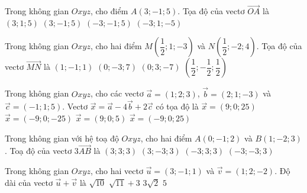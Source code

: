 \begin{ex}%
Trong không gian $Oxyz$, cho điểm $A(3;-1;5)$. Tọa độ của vectơ $\overrightarrow{OA}$ là
\choice
{$(3;1;5)$}
{\True $(3;-1;5)$}
{$(-3;-1;5)$}
{$(-3;1;-5)$}
\end{ex}


\begin{ex}%
Trong không gian $Oxyz$, cho hai điểm $M\left(\dfrac{1}{2};1;-3\right)$ và $N\left(\dfrac{1}{2};-2;4\right)$. Tọa độ của vectơ $\overrightarrow{MN}$ là
\choice
{$(1;-1;1)$}
{\True $(0;-3;7)$}
{$(0;3;-7)$}
{$\left(\dfrac{1}{2};-\dfrac{1}{2};\dfrac{1}{2} \right)$}
\end{ex}


\begin{ex}%
Trong không gian $Oxyz$, cho các vectơ $\overrightarrow{a}=(1;2;3)$, $\overrightarrow{b}=(2;1;-3)$ và $\overrightarrow{c}=(-1;1;5)$. Vectơ $\overrightarrow{x}=\overrightarrow{a}-4\overrightarrow{b}+2\overrightarrow{c}$ có tọa độ là
\choice
{$\overrightarrow{x}=(9;0;25)$}
{$\overrightarrow{x}=(-9;0;-25)$}
{$\overrightarrow{x}=(9;0;5)$}
{\True $\overrightarrow{x}=(-9;0;25)$}
\end{ex}


\begin{ex}%
Trong không gian với hệ toạ độ $Oxyz$, cho hai điểm $A(0;-1;2)$ và $B(1;-2;3)$. Toạ độ của vectơ $3\overrightarrow{AB}$ là
\choice
{$(3;3;3)$}
{\True $(3;-3;3)$}
{$(-3;3;3)$}
{$(-3;-3;3)$}
\end{ex}


\begin{ex}%
Trong không gian $Oxyz$, cho hai vectơ $\overrightarrow{u}=(3;-1;1)$ và $\overrightarrow{v}=(1;2;-2)$. Độ dài của vectơ $\overrightarrow{u}+\overrightarrow{v}$ là
\choice
{$\sqrt{10}$}
{$\sqrt{11}+3$}
{\True $3\sqrt{2}$}
{$5$}
\end{ex}


